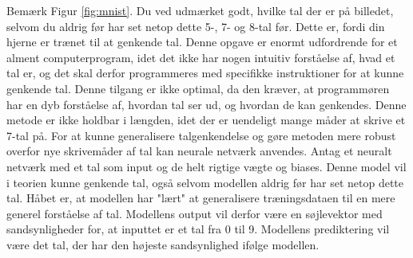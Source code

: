 \documentclass{article}
\newcommand{\figureref}[1]{Figur \ref{#1}}
\begin{document}
Bemærk \figureref{fig:mnist}. Du ved udmærket godt, hvilke tal der er på billedet, selvom du aldrig før har set netop dette 5-, 7- og 8-tal før. Dette er, fordi din hjerne er trænet til at genkende tal. Denne opgave er enormt udfordrende for et alment computerprogram, idet det ikke har nogen intuitiv forståelse af, hvad et tal er, og det skal derfor programmeres med specifikke instruktioner for at kunne genkende tal. Denne tilgang er ikke optimal, da den kræver, at programmøren har en dyb forståelse af, hvordan tal ser ud, og hvordan de kan genkendes. Denne metode er ikke holdbar i længden, idet der er uendeligt mange måder at skrive et 7-tal på. For at kunne generalisere talgenkendelse og gøre metoden mere robust overfor nye skrivemåder af tal kan neurale netværk anvendes. Antag et neuralt netværk med et tal som input og de helt rigtige vægte og biases. Denne model vil i teorien kunne genkende tal, også selvom modellen aldrig før har set netop dette tal. Håbet er, at modellen har "lært" at generalisere træningsdataen til en mere generel forståelse af tal. Modellens output vil derfor være en søjlevektor med sandsynligheder for, at inputtet er et tal fra 0 til 9. Modellens prediktering vil være det tal, der har den højeste sandsynlighed ifølge modellen.
\clearpage
\end{document}
